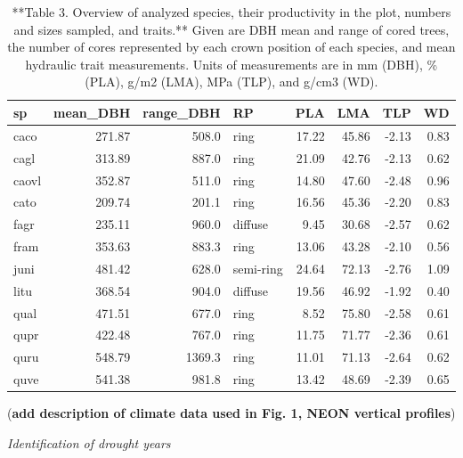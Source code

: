 \documentclass[]{article}
\begin{document}
\begin{table}[t]

\caption{\label{tab:Table3}**Table 3. Overview of analyzed species, their productivity in the plot, numbers and sizes sampled, and traits.**  Given are DBH mean and range of cored trees, the number of cores represented by each crown position of each species, and mean hydraulic trait measurements. Units of measurements are in mm (DBH), \% (PLA), g/m2 (LMA), MPa (TLP), and g/cm3 (WD).}
\centering
\begin{tabular}{lrrlrrrr}
\toprule
sp & mean\_DBH & range\_DBH & RP & PLA & LMA & TLP & WD\\
\midrule
caco & 271.87 & 508.0 & ring & 17.22 & 45.86 & -2.13 & 0.83\\
cagl & 313.89 & 887.0 & ring & 21.09 & 42.76 & -2.13 & 0.62\\
caovl & 352.87 & 511.0 & ring & 14.80 & 47.60 & -2.48 & 0.96\\
cato & 209.74 & 201.1 & ring & 16.56 & 45.36 & -2.20 & 0.83\\
fagr & 235.11 & 960.0 & diffuse & 9.45 & 30.68 & -2.57 & 0.62\\
\addlinespace
fram & 353.63 & 883.3 & ring & 13.06 & 43.28 & -2.10 & 0.56\\
juni & 481.42 & 628.0 & semi-ring & 24.64 & 72.13 & -2.76 & 1.09\\
litu & 368.54 & 904.0 & diffuse & 19.56 & 46.92 & -1.92 & 0.40\\
qual & 471.51 & 677.0 & ring & 8.52 & 75.80 & -2.58 & 0.61\\
qupr & 422.48 & 767.0 & ring & 11.75 & 71.77 & -2.36 & 0.61\\
\addlinespace
quru & 548.79 & 1369.3 & ring & 11.01 & 71.13 & -2.64 & 0.62\\
quve & 541.38 & 981.8 & ring & 13.42 & 48.69 & -2.39 & 0.65\\
\bottomrule
\end{tabular}
\end{table}

(\textbf{add description of climate data used in Fig. 1, NEON vertical
profiles})

\emph{Identification of drought years}
\end{document}
